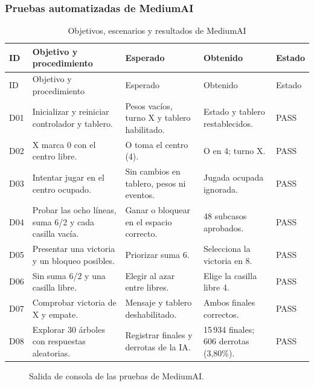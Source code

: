 \documentclass[12pt,a4paper]{article}
\begin{document}
\subsubsection{Pruebas automatizadas de MediumAI}
\begin{longtable}{p{1cm}p{3.4cm}p{3.3cm}p{3.4cm}p{1.6cm}}
\caption{Objetivos, escenarios y resultados de MediumAI}\\
\toprule ID & Objetivo y procedimiento & Esperado & Obtenido & Estado\\\midrule\endfirsthead
\toprule ID & Objetivo y procedimiento & Esperado & Obtenido & Estado\\\midrule\endhead
D01 & Inicializar y reiniciar controlador y tablero. & Pesos vacíos, turno X y tablero habilitado. & Estado y tablero restablecidos. & PASS\\
D02 & X marca 0 con el centro libre. & O toma el centro (4). & O en 4; turno X. & PASS\\
D03 & Intentar jugar en el centro ocupado. & Sin cambios en tablero, pesos ni eventos. & Jugada ocupada ignorada. & PASS\\
D04 & Probar las ocho líneas, suma 6/2 y cada casilla vacía. & Ganar o bloquear en el espacio correcto. & 48 subcasos aprobados. & PASS\\
D05 & Presentar una victoria y un bloqueo posibles. & Priorizar suma 6. & Selecciona la victoria en 8. & PASS\\
D06 & Sin suma 6/2 y una casilla libre. & Elegir al azar entre libres. & Elige la casilla libre 4. & PASS\\
D07 & Comprobar victoria de X y empate. & Mensaje y tablero deshabilitado. & Ambos finales correctos. & PASS\\
D08 & Explorar 30 árboles con respuestas aleatorias. & Registrar finales y derrotas de la IA. & 15\,934 finales; 606 derrotas (3,80\%). & PASS\\
\bottomrule
\end{longtable}

\begin{figure}[H]

\caption{Salida de consola de las pruebas de MediumAI.}
\label{fig:consola-medium}
\end{figure}
\end{document}
